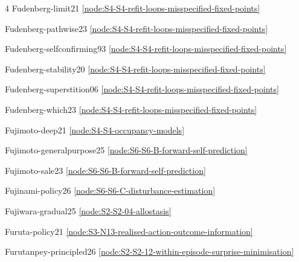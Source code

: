 \documentclass[10pt]{article}
\begin{document}
{\begin{multicols}{4}
Fudenberg-limit21 \hfill \ref{node:S4-S4-refit-loops-misspecified-fixed-points}\par
Fudenberg-pathwise23 \hfill \ref{node:S4-S4-refit-loops-misspecified-fixed-points}\par
Fudenberg-selfconfirming93 \hfill \ref{node:S4-S4-refit-loops-misspecified-fixed-points}\par
Fudenberg-stability20 \hfill \ref{node:S4-S4-refit-loops-misspecified-fixed-points}\par
Fudenberg-superstition06 \hfill \ref{node:S4-S4-refit-loops-misspecified-fixed-points}\par
Fudenberg-which23 \hfill \ref{node:S4-S4-refit-loops-misspecified-fixed-points}\par
Fujimoto-deep21 \hfill \ref{node:S4-S4-occupancy-models}\par
Fujimoto-generalpurpose25 \hfill \ref{node:S6-S6-B-forward-self-prediction}\par
Fujimoto-sale23 \hfill \ref{node:S6-S6-B-forward-self-prediction}\par
Fujinami-policy26 \hfill \ref{node:S6-S6-C-disturbance-estimation}\par
Fujiwara-gradual25 \hfill \ref{node:S2-S2-04-allostasis}\par
Furuta-policy21 \hfill \ref{node:S3-N13-realised-action-outcome-information}\par
Furutanpey-principled26 \hfill \ref{node:S2-S2-12-within-episode-surprise-minimisation}\par


\end{multicols}}
\end{document}
